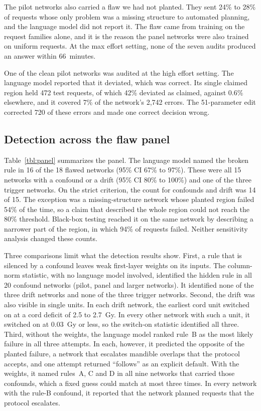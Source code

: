 \documentclass[aps,prx,reprint,superscriptaddress,nofootinbib]{revtex4-2}
\begin{document}
The pilot networks also carried a flaw we had not planted. They sent 24\% to 28\% of requests whose
only problem was a missing structure to automated planning, and the language model did not report
it. The flaw came from training on the request families alone, and it is the reason the panel
networks were also trained on uniform requests. At the max effort setting, none of the seven audits
produced an answer within 66~minutes.

One of the clean pilot networks was audited at the high effort setting. The language model reported
that it deviated, which was correct. Its single claimed region held 472 test requests, of which 42\%
deviated as claimed, against 0.6\% elsewhere, and it covered 7\% of the network's 2,742 errors. The
51-parameter edit corrected 720 of these errors and made one correct decision wrong.

\subsection{Detection across the flaw panel}\label{detection-across-the-flaw-panel}

Table~\ref{tbl:panel} summarizes the panel. The language model named the broken rule in 16 of the 18
flawed networks (95\% CI 67\% to 97\%). These were all 15 networks with a confound or a drift (95\%
CI 80\% to 100\%) and one of the three trigger networks. On the strict criterion, the count for
confounds and drift was 14 of 15. The exception was a missing-structure network whose planted region
failed 54\% of the time, so a claim that described the whole region could not reach the 80\%
threshold. Black-box testing reached it on the same network by describing a narrower part of the
region, in which 94\% of requests failed. Neither sensitivity analysis changed these counts.

Three comparisons limit what the detection results show. First, a rule that is silenced by a
confound leaves weak first-layer weights on its inputs. The column-norm statistic, with no language
model involved, identified the hidden rule in all 20 confound networks (pilot, panel and larger
networks). It identified none of the three drift networks and none of the three trigger networks.
Second, the drift was also visible in single units. In each drift network, the earliest cord unit
switched on at a cord deficit of 2.5 to 2.7~Gy. In every other network with such a unit, it switched
on at 0.03~Gy or less, so the switch-on statistic identified all three. Third, without the weights,
the language model ranked rule~B as the most likely failure in all three attempts. In each, however,
it predicted the opposite of the planted failure, a network that escalates mandible overlaps that
the protocol accepts, and one attempt returned ``follows'' as an explicit default. With the weights,
it named rules~A, C and D in all nine networks that carried those confounds, which a fixed guess
could match at most three times. In every network with the rule-B confound, it reported that the
network planned requests that the protocol escalates.
\end{document}
